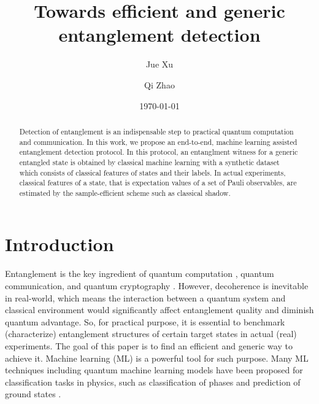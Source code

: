 \documentclass[
aps,
pra,
twocolumn,
floatfix,
]{revtex4-2}
\theoremstyle{plain}
\theoremstyle{definition}
\begin{document}
\title{Towards efficient and generic entanglement detection}
\author{Jue Xu}
\author{Qi Zhao}
\date{\today}
\begin{abstract}
	Detection of entanglement is an indispensable step to practical quantum computation and communication.
	In this work, we propose an end-to-end, machine learning assisted entanglement detection protocol.
	In this protocol, an entanglment witness for a generic entangled state is obtained by classical machine learning with a synthetic dataset which consists of classical features of states and their labels. 
	In actual experiments, classical features of a state, that is expectation values of a set of  Pauli observables, are estimated by the sample-efficient scheme such as classical shadow.
\end{abstract}

\maketitle

\section{Introduction}
Entanglement \cite{horodeckiQuantumEntanglement2009} is the key ingredient of quantum computation \cite{briegelMeasurementbasedQuantumComputation2009}, quantum communication, and quantum cryptography \cite{xuSecureQuantumKey2020}.
However, decoherence is inevitable in real-world, which means the interaction between a quantum system and classical environment would significantly affect entanglement quality and diminish quantum advantage. 
So, for practical purpose, it is essential to benchmark (characterize) entanglement structures of certain target states in actual (real) experiments.
The goal of this paper is to find an efficient and generic way to achieve it. 
Machine learning (ML) is a powerful tool for such purpose. 
Many ML techniques including quantum machine learning models \cite{congQuantumConvolutionalNeural2019} have been proposed for classification tasks in physics, such as classification of phases and prediction of ground states \cite{carrasquillaMachineLearningPhases2017} \cite{huangProvablyEfficientMachine2022}.
\end{document}
